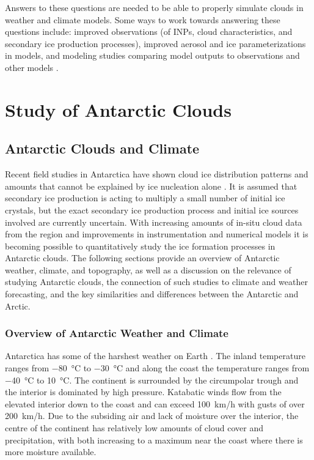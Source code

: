 Answers to these questions are needed to be able to properly simulate clouds in weather and climate models. Some ways to work towards answering these questions include: improved observations (of INPs, cloud characteristics, and secondary ice production processes), improved aerosol and ice parameterizations in models, and modeling studies comparing model outputs to observations and other models \citep{field2017}.

\chapter{Study of Antarctic Clouds}
\section{Antarctic Clouds and Climate} \label{ch:ant}
Recent field studies in Antarctica have shown cloud ice distribution patterns and amounts that cannot be explained by ice nucleation alone \citep[e.g.][]{oshea2017}. It is assumed that secondary ice production is acting to multiply a small number of initial ice crystals, but the exact secondary ice production process and initial ice sources involved are currently uncertain. With increasing amounts of in-situ cloud data from the region and improvements in instrumentation and numerical models it is becoming possible to quantitatively study the ice formation processes in Antarctic clouds. The following sections provide an overview of Antarctic weather, climate, and topography, as well as a discussion on the relevance of studying Antarctic clouds, the connection of such studies to climate and weather forecasting, and the key similarities and differences between the Antarctic and Arctic.

\subsection{Overview of Antarctic Weather and Climate}
Antarctica has some of the harshest weather on Earth \citep{laws2014}. The inland temperature ranges from \SI{-80}{\degreeCelsius} to \SI{-30}{\degreeCelsius} and along the coast the temperature ranges from \SI{-40}{\degreeCelsius} to \SI{10}{\degreeCelsius}. The continent is surrounded by the circumpolar trough and the interior is dominated by high pressure. Katabatic winds flow from the elevated interior down to the coast and can exceed \SI{100}{km/h} with gusts of over \SI{200}{km/h}. Due to the subsiding air and lack of moisture over the interior, the centre of the continent has relatively low amounts of cloud cover and precipitation, with both increasing to a maximum near the coast where there is more moisture available. \citep{antwx,lach2010,adhi2012,brom2012}

